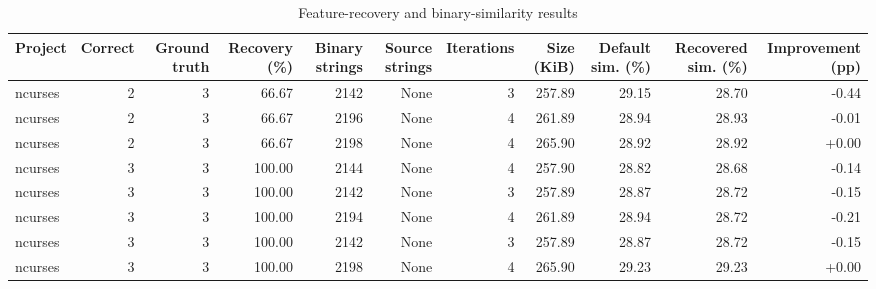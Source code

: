 \begin{table}[htbp]
\centering
\caption{Feature-recovery and binary-similarity results}
\label{tab:feature-recovery-results}
\small
\begin{tabular}{lrrrrrrrrrr}
\toprule
Project & Correct & Ground truth & Recovery (\%) & Binary strings & Source strings & Iterations & Size (KiB) & Default sim. (\%) & Recovered sim. (\%) & Improvement (pp) \\
\midrule
ncurses & 2 & 3 & 66.67 & 2142 & None & 3 & 257.89 & 29.15 & 28.70 & -0.44 \\
ncurses & 2 & 3 & 66.67 & 2196 & None & 4 & 261.89 & 28.94 & 28.93 & -0.01 \\
ncurses & 2 & 3 & 66.67 & 2198 & None & 4 & 265.90 & 28.92 & 28.92 & +0.00 \\
ncurses & 3 & 3 & 100.00 & 2144 & None & 4 & 257.90 & 28.82 & 28.68 & -0.14 \\
ncurses & 3 & 3 & 100.00 & 2142 & None & 3 & 257.89 & 28.87 & 28.72 & -0.15 \\
ncurses & 3 & 3 & 100.00 & 2194 & None & 4 & 261.89 & 28.94 & 28.72 & -0.21 \\
ncurses & 3 & 3 & 100.00 & 2142 & None & 3 & 257.89 & 28.87 & 28.72 & -0.15 \\
ncurses & 3 & 3 & 100.00 & 2198 & None & 4 & 265.90 & 29.23 & 29.23 & +0.00 \\
\bottomrule
\end{tabular}
\end{table}
